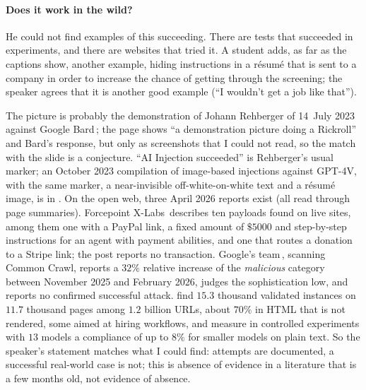 \paragraph{Does it work in the wild?}
He could not find examples of this succeeding. There are tests that succeeded in experiments, and there are websites that tried it. A student adds, as far as the captions show\flag, another example, hiding instructions in a r\'esum\'e that is sent to a company in order to increase the chance of getting through the screening; the speaker agrees that it is another good example (``I wouldn't get a job like that'').

\begin{beyond}
The picture is probably the demonstration of Johann Rehberger of 14~July 2023 against Google Bard\,\citep{rehberger2023}; the page shows ``a demonstration picture doing a Rickroll'' and Bard's response, but only as screenshots that I could not read, so the match with the slide is a conjecture. ``AI Injection succeeded'' is Rehberger's usual marker; an October 2023 compilation of image-based injections against GPT-4V, with the same marker, a near-invisible off-white-on-white text and a r\'esum\'e image, is in \citet{willison2023}. On the open web, three April 2026 reports exist (all read through page summaries). Forcepoint X-Labs\,\citep{sewani2026} describes ten payloads found on live sites, among them one with a PayPal link, a fixed amount of $\$5000$ and step-by-step instructions for an agent with payment abilities, and one that routes a donation to a Stripe link; the post reports no transaction. Google's team\,\citep{brunner2026}, scanning Common Crawl, reports a $32\%$ relative increase of the \emph{malicious} category between November 2025 and February 2026, judges the sophistication low, and reports no confirmed successful attack. \citet{khodayari2026} find $15.3$ thousand validated instances on $11.7$ thousand pages among $1.2$ billion URLs, about $70\%$ in HTML that is not rendered, some aimed at hiring workflows, and measure in controlled experiments with $13$ models a compliance of up to $8\%$ for smaller models on plain text. So the speaker's statement matches what I could find: attempts are documented, a successful real-world case is not; this is absence of evidence in a literature that is a few months old, not evidence of absence.
\end{beyond}

